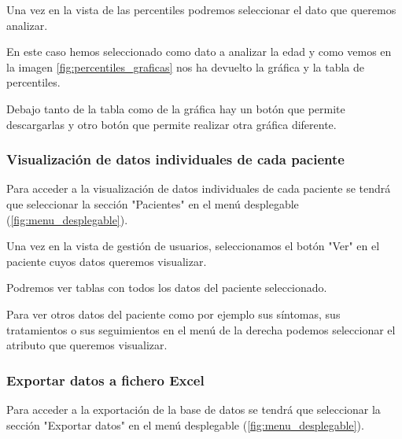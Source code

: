 
Una vez en la vista de las percentiles podremos seleccionar el dato que queremos analizar.


En este caso hemos seleccionado como dato a analizar la edad y como vemos en la imagen \ref{fig:percentiles_graficas} nos ha devuelto la gráfica y la tabla de percentiles.

Debajo tanto de la tabla como de la gráfica hay un botón que permite descargarlas y otro botón que permite realizar otra gráfica diferente.


\subsubsection{Visualización de datos individuales de cada paciente}

Para acceder a la visualización de datos individuales de cada paciente se tendrá que seleccionar la sección "Pacientes"{} en el menú desplegable (\ref{fig:menu_desplegable}).


Una vez en la vista de gestión de usuarios, seleccionamos el botón "Ver" en el paciente cuyos datos queremos visualizar.


Podremos ver tablas con todos los datos del paciente seleccionado.


Para ver otros datos del paciente como por ejemplo sus síntomas, sus tratamientos o sus seguimientos en el menú de la derecha podemos seleccionar el atributo que queremos visualizar.


\subsubsection{Exportar datos a fichero Excel}

Para acceder a la exportación de la base de datos se tendrá que seleccionar la sección "Exportar datos"{} en el menú desplegable (\ref{fig:menu_desplegable}).


